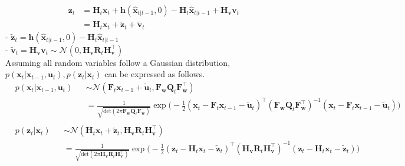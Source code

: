 \documentclass[10pt]{article}
\begin{document}
\begin{equation} \label{eq:ekf2}
	\boxed{ \begin{aligned}
			\mathbf{z}_{t} & = \mathbf{H}_{t}\mathbf{x}_{t} + \mathbf{h}(\hat{\mathbf{x}}_{t|t-1}, 0) - \mathbf{H}_{t}\hat{\mathbf{x}}_{t|t-1} + \mathbf{H}_{\mathbf{v}}\mathbf{v}_{t} \\ 
			& = \mathbf{H}_{t}\mathbf{x}_{t}  + \tilde{\mathbf{z}}_{t} + \tilde{\mathbf{v}}_{t}
	\end{aligned} }
\end{equation}
- $\tilde{\mathbf{z}}_{t} = \mathbf{h}(\hat{\mathbf{x}}_{t|t-1}, 0) - \mathbf{H}_{t}\hat{\mathbf{x}}_{t|t-1}$ \\
- $\tilde{\mathbf{v}}_{t} = \mathbf{H}_{\mathbf{v}}\mathbf{v}_{t} \sim \mathcal{N}(0,  \mathbf{H}_{\mathbf{v}}\mathbf{R}_{t} \mathbf{H}_{\mathbf{v}}^{\intercal})$ \\

	 Assuming all random variables follow a Gaussian distribution, $p(\mathbf{x}_{t} | \mathbf{x}_{t-1}, \mathbf{u}_{t}), p(\mathbf{z}_{t} | \mathbf{x}_{t})$ can be expressed as follows.
	\begin{equation}
		\begin{aligned}
			& p(\mathbf{x}_{t} | \mathbf{x}_{t-1}, \mathbf{u}_{t}) && \sim \mathcal{N}(\mathbf{F}_{t}\mathbf{x}_{t-1} + \tilde{\mathbf{u}}_{t}, \mathbf{F}_{\mathbf{w}}\mathbf{Q}_{t} \mathbf{F}_{\mathbf{w}}^{\intercal} ) \\
			& && = \frac{1}{ \sqrt{\text{det}(2\pi \mathbf{F}_{\mathbf{w}}\mathbf{Q}_{t} \mathbf{F}_{\mathbf{w}}^{\intercal} )}}\exp\bigg( -\frac{1}{2}(\mathbf{x}_{t} - \mathbf{F}_{t}\mathbf{x}_{t-1} - \tilde{\mathbf{u}}_{t})^{\intercal}( \mathbf{F}_{\mathbf{w}}\mathbf{Q}_{t} \mathbf{F}_{\mathbf{w}}^{\intercal} )^{-1}(\mathbf{x}_{t} - \mathbf{F}_{t}\mathbf{x}_{t-1} - \tilde{\mathbf{u}}_{t}) \bigg)\\ 
		\end{aligned}
	\end{equation}
	\begin{equation}
		\begin{aligned}
			& p(\mathbf{z}_{t} | \mathbf{x}_{t})  && \sim \mathcal{N}(\mathbf{H}_{t}\mathbf{x}_{t} + \tilde{\mathbf{z}}_{t},  \mathbf{H}_{\mathbf{v}}\mathbf{R}_{t} \mathbf{H}_{\mathbf{v}}^{\intercal} ) \\
			& && = \frac{1}{ \sqrt{\text{det}(2\pi \mathbf{H}_{\mathbf{v}}\mathbf{R}_{t} \mathbf{H}_{\mathbf{v}}^{\intercal} )}}\exp\bigg( -\frac{1}{2}(\mathbf{z}_{t} - \mathbf{H}_{t}\mathbf{x}_{t} - \tilde{\mathbf{z}}_{t})^{\intercal}(  \mathbf{H}_{\mathbf{v}}\mathbf{R}_{t} \mathbf{H}_{\mathbf{v}}^{\intercal} )^{-1}(\mathbf{z}_{t}- \mathbf{H}_{t}\mathbf{x}_{t} - \tilde{\mathbf{z}}_{t}) \bigg)
		\end{aligned}
	\end{equation}
	
\end{document}
